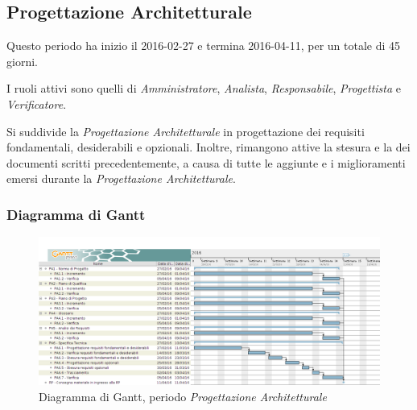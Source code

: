 \subsection{Progettazione Architetturale}
Questo periodo ha inizio il 2016-02-27 e termina 2016-04-11, per un totale di 45 giorni.

I ruoli attivi sono quelli di \textit{Amministratore}, \textit{Analista}, \textit{Responsabile}, \textit{Progettista} e \textit{Verificatore}.

Si suddivide la \textit{Progettazione Architetturale} in progettazione dei requisiti fondamentali, desiderabili e opzionali. Inoltre, rimangono attive la stesura e la  dei documenti scritti precedentemente, a causa di tutte le aggiunte e i miglioramenti emersi durante la \textit{Progettazione Architetturale}.

\subsubsection{Diagramma di Gantt}
\begin{figure}[ht!]
  \includegraphics[width=1\textwidth]{res/img/pianificazione/ProgettazioneArchitetturale}
  \caption{Diagramma di Gantt, periodo \textit{Progettazione Architetturale}}
\end{figure}

